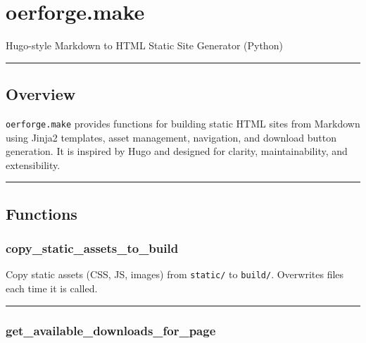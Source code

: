\section{oerforge.make}\label{oerforge.make}

Hugo-style Markdown to HTML Static Site Generator (Python)

\begin{center}\rule{0.5\linewidth}{0.5pt}\end{center}

\subsection{Overview}\label{overview}

\texttt{oerforge.make} provides functions for building static HTML sites
from Markdown using Jinja2 templates, asset management, navigation, and
download button generation. It is inspired by Hugo and designed for
clarity, maintainability, and extensibility.

\begin{center}\rule{0.5\linewidth}{0.5pt}\end{center}

\subsection{Functions}\label{functions}

\subsubsection{copy\_static\_assets\_to\_build}\label{copy_static_assets_to_build}

\begin{Shaded}
\begin{Highlighting}[]
\end{Highlighting}
\end{Shaded}

Copy static assets (CSS, JS, images) from \texttt{static/} to
\texttt{build/}. Overwrites files each time it is called.

\begin{center}\rule{0.5\linewidth}{0.5pt}\end{center}

\subsubsection{get\_available\_downloads\_for\_page}\label{get_available_downloads_for_page}

